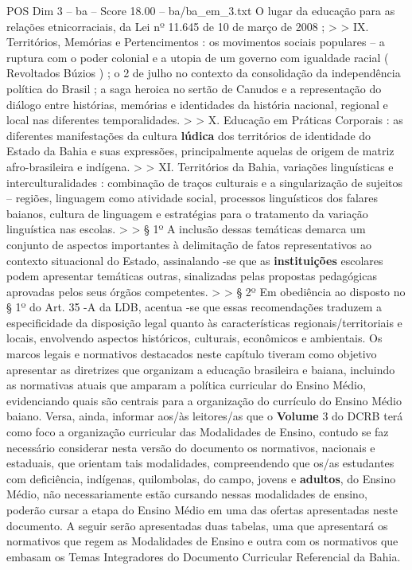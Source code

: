 \begin{textsample}{POS Dim 3 – ba – Score 18.00 – ba/ba\_em\_3.txt}
O lugar da educação para as relações etnicorraciais, da Lei nº 11.645 de 10 de março de 2008 ; > > IX.
Territórios, Memórias e Pertencimentos : os movimentos sociais populares – a ruptura com o poder colonial e a utopia de um governo com igualdade racial ( Revoltados Búzios ) ; o 2 de julho no contexto da consolidação da independência política do Brasil ; a saga heroica no sertão de Canudos e a representação do diálogo entre histórias, memórias e identidades da história nacional, regional e local nas diferentes temporalidades. > > X.
Educação em Práticas Corporais : as diferentes manifestações da cultura \textbf{lúdica} dos territórios de identidade do Estado da Bahia e suas expressões, principalmente aquelas de origem de matriz afro-brasileira e indígena. > > XI.
Territórios da Bahia, variações linguísticas e interculturalidades : combinação de traços culturais e a singularização de sujeitos – regiões, linguagem como atividade social, processos linguísticos dos falares baianos, cultura de linguagem e estratégias para o tratamento da variação linguística nas escolas. > > § 1º A inclusão dessas temáticas demarca um conjunto de aspectos importantes à delimitação de fatos representativos ao contexto situacional do Estado, assinalando -se que as \textbf{instituições} escolares podem apresentar temáticas outras, sinalizadas pelas propostas pedagógicas aprovadas pelos seus órgãos competentes. > > § 2º Em obediência ao disposto no § 1º do Art. 35 -A da LDB, acentua -se que essas recomendações traduzem a especificidade da disposição legal quanto às características regionais/territoriais e locais, envolvendo aspectos históricos, culturais, econômicos e ambientais.
Os marcos legais e normativos destacados neste capítulo tiveram como objetivo apresentar as diretrizes que organizam a educação brasileira e baiana, incluindo as normativas atuais que amparam a política curricular do Ensino Médio, evidenciando quais são centrais para a organização do currículo do Ensino Médio baiano.
Versa, ainda, informar aos/às leitores/as que o \textbf{Volume} 3 do DCRB terá como foco a organização curricular das Modalidades de Ensino, contudo se faz necessário considerar nesta versão do documento os normativos, nacionais e estaduais, que orientam tais modalidades, compreendendo que os/as estudantes com deficiência, indígenas, quilombolas, do campo, jovens e \textbf{adultos}, do Ensino Médio, não necessariamente estão cursando nessas modalidades de ensino, poderão cursar a etapa do Ensino Médio em uma das ofertas apresentadas neste documento.
A seguir serão apresentadas duas tabelas, uma que apresentará os normativos que regem as Modalidades de Ensino e outra com os normativos que embasam os Temas Integradores do Documento Curricular Referencial da Bahia.

\end{textsample}
